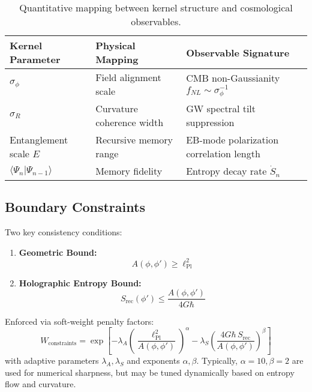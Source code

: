 \begin{table}[h!]
\centering
\begin{tabular}{lll}
\toprule
\textbf{Kernel Parameter} & \textbf{Physical Mapping} & \textbf{Observable Signature} \\
\midrule
\(\sigma_\phi\) & Field alignment scale & CMB non-Gaussianity \(f_{NL} \sim \sigma_\phi^{-1}\) \\
\(\sigma_R\) & Curvature coherence width & GW spectral tilt suppression \\
Entanglement scale \(E\) & Recursive memory range & EB-mode polarization correlation length \\
\(\langle \Psi_n | \Psi_{n-1} \rangle\) & Memory fidelity & Entropy decay rate \(\dot{S}_n\) \\
\bottomrule
\end{tabular}
\caption{Quantitative mapping between kernel structure and cosmological observables.}
\end{table}

\subsection{Boundary Constraints}
\label{subsec:constraints}

Two key consistency conditions:
\begin{enumerate}
    \item \textbf{Geometric Bound:}
    \begin{equation}
    A(\phi,\phi') \geq \ell_{\text{Pl}}^2
    \end{equation}
    \item \textbf{Holographic Entropy Bound:}
    \begin{equation}
    S_{\text{rec}}(\phi') \leq \frac{A(\phi,\phi')}{4G\hbar}
    \end{equation}
\end{enumerate}

Enforced via soft-weight penalty factors:
\begin{equation}
W_{\text{constraints}} = \exp\left[
    -\lambda_A\left(\frac{\ell_{\text{Pl}}^2}{A(\phi,\phi')}\right)^{\alpha} 
    - \lambda_S\left(\frac{4G\hbar\, S_{\text{rec}}}{A(\phi,\phi')}\right)^{\beta}
\right]
\end{equation}
with adaptive parameters \(\lambda_A, \lambda_S\) and exponents \(\alpha, \beta\). Typically, \(\alpha=10, \beta=2\) are used for numerical sharpness, but may be tuned dynamically based on entropy flow and curvature.

